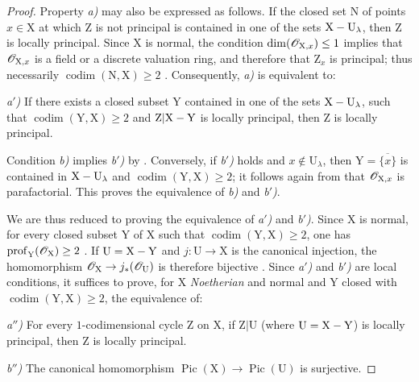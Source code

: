 \begin{proof}
Property \emph{a)} may also be expressed as follows. If the closed set $\mathrm{N}$ of points $x\in\mathrm{X}$ at which $\mathrm{Z}$ is not principal is contained in one of the sets $\mathrm{X}-\mathrm{U}_\lambda$, then $\mathrm{Z}$ is locally principal. Since $\mathrm{X}$ is normal, the condition $\dim(\mathscr{O}_{\mathrm{X},x})\leq 1$ implies that $\mathscr{O}_{\mathrm{X},x}$ is a field or a discrete valuation ring, and therefore that $\mathrm{Z}_x$ is principal; thus necessarily $\operatorname{codim}(\mathrm{N},\mathrm{X})\geq 2$ . Consequently, \emph{a)} is equivalent to:

\emph{a$'$)} If there exists a closed subset $\mathrm{Y}$ contained in one of the sets $\mathrm{X}-\mathrm{U}_\lambda$, such that $\operatorname{codim}(\mathrm{Y},\mathrm{X})\geq 2$ and $\mathrm{Z}|\mathrm{X}-\mathrm{Y}$ is locally principal, then $\mathrm{Z}$ is locally principal.

Condition \emph{b)} implies \emph{b$'$)} by . Conversely, if \emph{b$'$)} holds and $x\notin\mathrm{U}_\lambda$, then $\mathrm{Y}=\overline{\{x\}}$ is contained in $\mathrm{X}-\mathrm{U}_\lambda$ and $\operatorname{codim}(\mathrm{Y},\mathrm{X})\geq 2$; it follows again from  that $\mathscr{O}_{\mathrm{X},x}$ is parafactorial. This proves the equivalence of \emph{b)} and \emph{b$'$)}.

We are thus reduced to proving the equivalence of \emph{a$'$)} and \emph{b$'$)}. Since $\mathrm{X}$ is normal, for every closed subset $\mathrm{Y}$ of $\mathrm{X}$ such that $\operatorname{codim}(\mathrm{Y},\mathrm{X})\geq 2$, one has $\operatorname{prof}_{\mathrm{Y}}(\mathscr{O}_{\mathrm{X}})\geq 2$ . If $\mathrm{U}=\mathrm{X}-\mathrm{Y}$ and $j:\mathrm{U}\to\mathrm{X}$ is the canonical injection, the homomorphism $\mathscr{O}_{\mathrm{X}}\to j_*(\mathscr{O}_{\mathrm{U}})$ is therefore bijective . Since \emph{a$'$)} and \emph{b$'$)} are local conditions, it suffices to prove, for $\mathrm{X}$ \emph{Noetherian} and normal and $\mathrm{Y}$ closed with $\operatorname{codim}(\mathrm{Y},\mathrm{X})\geq 2$, the equivalence of:

\emph{a$''$)} For every $1$-codimensional cycle $\mathrm{Z}$ on $\mathrm{X}$, if $\mathrm{Z}|\mathrm{U}$ (where $\mathrm{U}=\mathrm{X}-\mathrm{Y}$) is locally principal, then $\mathrm{Z}$ is locally principal.

\emph{b$''$)} The canonical homomorphism $\operatorname{Pic}(\mathrm{X})\to\operatorname{Pic}(\mathrm{U})$ is surjective.


\end{proof}
